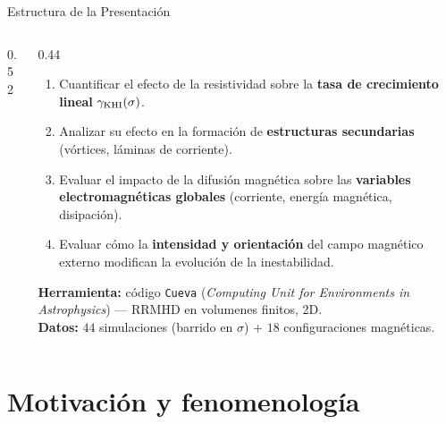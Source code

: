 \documentclass[aspectratio=169,9pt]{beamer}
\begin{document}
\begin{frame}{Estructura de la Presentaci\'on}
\begin{columns}[T]
\begin{column}{0.52\textwidth}
  \vspace*{0.25cm}
  {%
   \tableofcontents}
\end{column}
\begin{column}{0.44\textwidth}
  \pause
  \begin{tcolorbox}[RES={Objetivos espec\'ificos del trabajo}]
    \scriptsize
    \begin{enumerate}\setlength\itemsep{3pt}
      \item Cuantificar el efecto de la resistividad sobre la
            \textbf{tasa de crecimiento lineal} $\gamma_{\rm KHI}(\sigma)$.
      \item Analizar su efecto en la formaci\'on de
            \textbf{estructuras secundarias} (v\'ortices, l\'aminas de corriente).
      \item Evaluar el impacto de la difusi\'on magn\'etica sobre las
            \textbf{variables electromagn\'eticas globales}
            (corriente, energ\'ia magn\'etica, disipaci\'on).
      \item Evaluar c\'omo la \textbf{intensidad y orientaci\'on} del campo
            magn\'etico externo modifican la evoluci\'on de la inestabilidad.
    \end{enumerate}
  \end{tcolorbox}
  \pause\vspace{0.15cm}
  {\scriptsize\color{primary}\textbf{Herramienta:} c\'odigo \texttt{Cueva}
   (\textit{Computing Unit for Environments in Astrophysics})
   \citep{miranda-aranguren-2014,miranda-aranguren-2018} ---
   RRMHD en volumenes finitos, 2D.\\
   \textbf{Datos:} $44$ simulaciones (barrido en $\sigma$)
   $+$ $18$ configuraciones magn\'eticas.}
\end{column}
\end{columns}
\end{frame}

\section{Motivaci\'on y fenomenolog\'ia}
\end{document}
